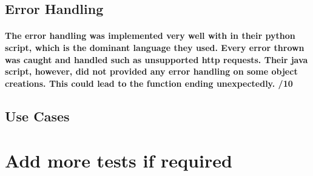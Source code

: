 \documentclass[11pt]{article}
\begin{document}
		\subsection{Error Handling}
		    \paragraph{The error handling was implemented very well with in their python script, which is the dominant language they used. Every error thrown was caught and handled such as unsupported http requests. Their java script, however, did not provided any error handling on some object creations. This could lead to the function ending unexpectedly. /10}
		\subsection{Use Cases} 
			\paragraph{}
	\section{Add more tests if required}


	
	
\end{document}
